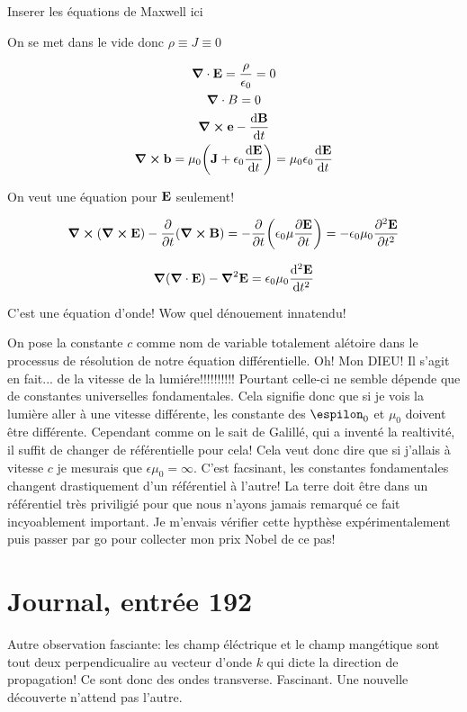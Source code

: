 


Inserer les équations de Maxwell ici

On se met dans le vide donc $\rho \equiv J\equiv 0$ 


\begin{gather}
	\grad \cdot \vb E = \frac{\rho}{\epsilon_0} =0\\
	\grad \cdot B = 0\\
	\grad \cross \vb e -\dv{\vb B}{t}\\
	\grad \cross \vb b = \mu_0\qty(\vb J + \epsilon_0 \dv{\vb E}{t})= \mu_0\epsilon_0 \dv{\vb E}{t}
\end{gather}

On veut une équation pour $\vb E$ seulement!

$$\grad \cross (\grad \cross \vb E) - \pdv{t}(\grad \cross \vb B) = -\pdv{t}(\epsilon_0\mu\pdv{\vb E}{t}) = -\epsilon_0 \mu_0 \pdv[2]{\vb E}{t} $$

$$\grad(\grad\cdot \vb E) - \grad^2\vb E = \epsilon_0\mu_0 \dv[2]{\vb E}{t}$$

C'est une équation d'onde! Wow quel dénouement innatendu!


On pose la constante $c$ comme nom de variable totalement alétoire dans le processus de résolution de notre équation différentielle. Oh! Mon DIEU! Il s'agit en fait... de la vitesse de la lumiére!!!!!!!!!! Pourtant celle-ci ne semble dépende que de constantes universelles fondamentales. Cela signifie donc que si je vois la lumière aller à une vitesse différente, les constante des $\espilon_0$ et $\mu_0$ doivent être différente. Cependant comme on le sait de Galillé, qui a inventé la realtivité, il suffit de changer de référentielle pour cela! Cela veut donc dire que si j'allais à vitesse $c$ je mesurais que $\epsilon\mu_0 = \infty$. C'est facsinant, les constantes fondamentales changent drastiquement d'un référentiel à l'autre! La terre doit être dans un référentiel très priviligié pour que nous n'ayons jamais remarqué ce fait incyoablement important. Je m'envais vérifier cette hypthèse expérimentalement puis passer par go pour collecter mon prix Nobel de ce pas! 

\section*{Journal, entrée 192}
Autre observation fasciante: les champ éléctrique et le champ mangétique sont tout deux perpendicualire au vecteur d'onde $k$ qui dicte la direction de propagation! Ce sont donc des ondes transverse. Fascinant. Une nouvelle découverte n'attend pas l'autre.  



